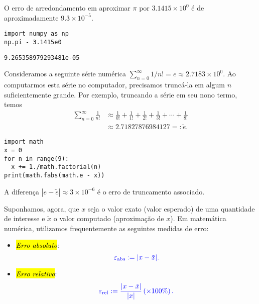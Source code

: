 \begin{ex}\label{ex:erro_de_arredondamento}
  O erro de arredondamento em aproximar $\pi$ por $3.1415\times 10^0$ é de aproximadamente $9.3\times 10^{-5}$.
  
\begin{lstlisting}
import numpy as np
np.pi - 3.1415e0
\end{lstlisting}

\begin{verbatim}
9.265358979293481e-05    
\end{verbatim}
  
\end{ex}

\begin{ex}\label{ex:erro_de_truncamento}
  Consideramos a seguinte série numérica $\sum_{n=0}^\infty 1/n! = e \approx 2.7183\times 10^0$. Ao computarmos esta série no computador, precisamos truncá-la em algum $n$ suficientemente grande. Por exemplo, truncando a série em seu nono termo, temos
  \begin{align}
    \sum_{n=0}^\infty \frac{1}{n!} &\approx \frac{1}{0!} + \frac{1}{1!} + \frac{1}{2!} + \frac{1}{3!} + \cdots + \frac{1}{8!} \\
    &\approx 2.71827876984127 =: \tilde{e}.
  \end{align}

  
\begin{lstlisting}
import math
x = 0
for n in range(9):
  x += 1./math.factorial(n)
print(math.fabs(math.e - x))
\end{lstlisting}
  
A diferença $|e - \tilde{e}| \approx 3\times 10^{-6}$ é o erro de truncamento associado.
\end{ex}

Suponhamos, agora, que $x$ seja o valor exato (valor esperado) de uma quantidade de interesse e $\tilde{x}$ o valor computado (aproximação de $x$). Em matemática numérica, utilizamos frequentemente as seguintes medidas de erro:
\begin{itemize}
  \item \hl{\emph{Erro absoluto}}:
    \begin{equation}
      \color{blue}\varepsilon_{\text{abs}} := |x - \tilde{x}|.
    \end{equation}
  \item \hl{\emph{Erro relativo}}:
    \begin{equation}
      \color{blue}\varepsilon_{\text{rel}} := \frac{|x - \tilde{x}|}{|x|}\left(\times 100\%\right).
    \end{equation}
\end{itemize}

